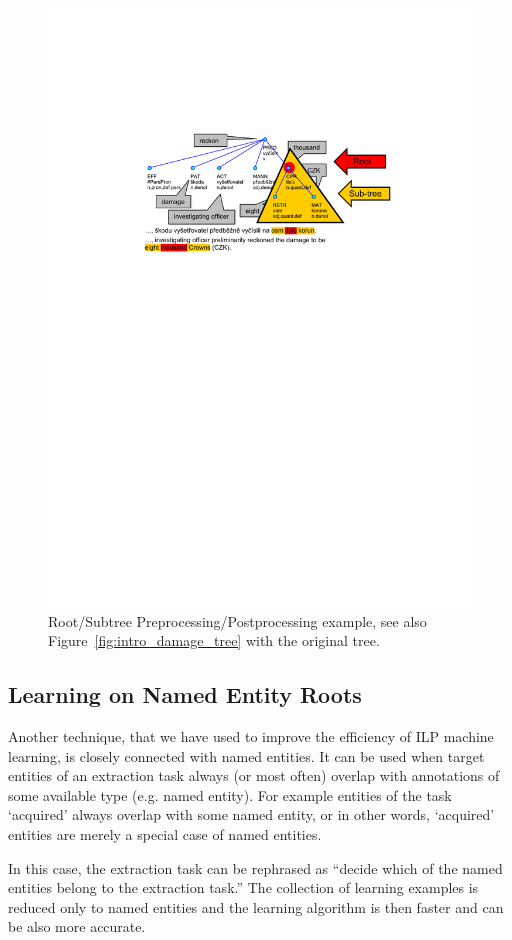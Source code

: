 \begin{figure}
	\centering
		\includegraphics[width=0.85\hsize]{tree-subtree}
	\caption{Root/Subtree Preprocessing/Postprocessing example, see also Figure~\ref{fig:intro_damage_tree} with the original tree.}
	\label{fig:tree-subtree}
\end{figure}


\subsection{Learning on Named Entity Roots} \label{sec:learning_ne_roots}
Another technique, that we have used to improve the efficiency of ILP machine learning, is closely connected with named entities. It can be used when target entities of an extraction task always (or most often) overlap with annotations of some available type (e.g. named entity). For example entities of the task `acquired' always overlap with some named entity, or in other words, `acquired' entities are merely a special case of named entities.

In this case, the extraction task can be rephrased as ``decide which of the named entities belong to the extraction task.'' The collection of learning examples is reduced only to named entities and the learning algorithm is then faster and can be also more accurate.

